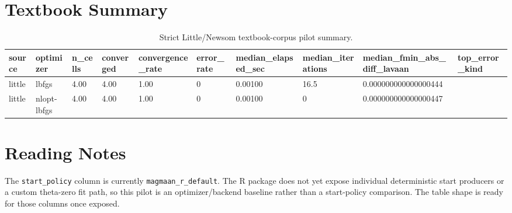 \documentclass[11pt]{article}
\begin{document}
\section*{Textbook Summary}
\begin{table}[ht]
\centering
\caption{Strict Little/Newsom textbook-corpus pilot summary.}
\begin{tabular}{llllllllll}
\hline
source & optimizer & n\_cells & converged & convergence\_rate & error\_rate & median\_elapsed\_sec & median\_iterations & median\_fmin\_abs\_diff\_lavaan & top\_error\_kind
\\ \hline
little & lbfgs & 4.00 & 4.00 & 1.00 & 0 & 0.00100 & 16.5 & 0.000000000000000444 &  \\
little & nlopt-lbfgs & 4.00 & 4.00 & 1.00 & 0 & 0.00100 & 0 & 0.000000000000000447 &  \\
\hline
\end{tabular}
\end{table}
\section*{Reading Notes}
The \texttt{start\_policy} column is currently \texttt{magmaan\_r\_default}. The R package does not yet expose individual deterministic start producers or a custom theta-zero fit path, so this pilot is an optimizer/backend baseline rather than a start-policy comparison. The table shape is ready for those columns once exposed.
\end{document}
